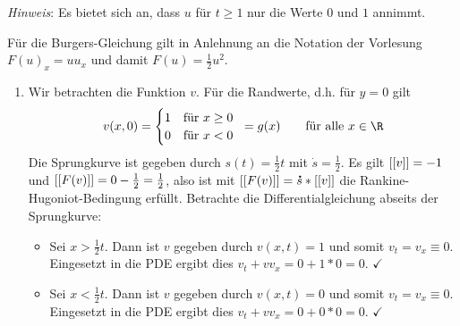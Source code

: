 \begin{exercisePage}
\begin{task}
\begin{enumerate}
\begin{enumerate}
			\textit{Hinweis}: Es bietet sich an, dass $u$ für $t \geq 1$ nur die Werte $0$ und $1$ annimmt.
		\end{enumerate}
	\end{enumerate}
\end{task}

Für die Burgers-Gleichung gilt in Anlehnung an die Notation der Vorlesung $F(u)_x = u u_x$ und damit $F(u) = \frac{1}{2} u^2$.
\begin{enumerate}[label=(zu \alph*), leftmargin=*]
	\item Wir betrachten die Funktion $v$. Für die Randwerte, d.h. für $y=0$ gilt 
	\begin{equation*}
		v(x,0) = \begin{cases} 1 &\text{für } x \geq 0 \\ 0 & \text{für } x < 0 \end{cases} \enskip = g(x) \qquad \text{für alle } x \in \R
	\end{equation*}
	Die Sprungkurve ist gegeben durch $s(t) = \frac{1}{2} t$ mit $\dot{s} = \frac{1}{2}$. Es gilt $\left[\left[ v \right]\right] = -1$ und $\left[\left[ F(v) \right]\right] = 0 - \frac{1}{2} = \frac{1}{2}$, also ist mit $\left[\left[ F(v) \right]\right] = \accentset{\mbox{\large\bfseries .}}{s} * \left[\left[ v \right]\right]$ die Rankine-Hugoniot-Bedingung erfüllt.
	Betrachte die Differentialgleichung abseits der Sprungkurve:
	\begin{itemize}
		\item Sei $x > \frac{1}{2} t$. Dann ist $v$ gegeben durch $v(x,t) = 1$ und somit $v_t = v_x \equiv 0$. Eingesetzt in die PDE ergibt dies $v_t + v v_x = 0 + 1 * 0 = 0$. $\checkmark$ 
		\item Sei $x < \frac{1}{2} t$. Dann ist $v$ gegeben durch $v(x,t) = 0$ und somit $v_t = v_x \equiv 0$. Eingesetzt in die PDE ergibt dies $v_t + v v_x = 0 + 0 * 0 = 0$. $\checkmark$ 
	\end{itemize}


\end{enumerate}
\end{exercisePage}
